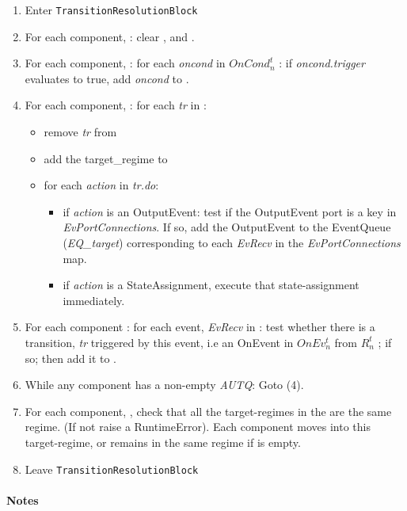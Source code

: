 \documentclass{article}
\begin{document}
\begin{enumerate}
\item Enter {\tt TransitionResolutionBlock}
\item For each component, \CN: clear \RCLn, \AUTQn and \EQn.
\item For each component, \CN: for each \textsl{oncond} in $OnCond^{t}_{n}$ : if
\textsl{oncond.trigger} evaluates to true, add \textsl{oncond} to \AUTQn.
\item For each component, \CN:  for each \textsl{tr} in \AUTQn :
\begin{itemize}
\item
remove \textsl{tr} from \AUTQn
\item add the target\_regime to \RCLn
\item for each
\textsl{action} in \textsl{tr.do}:
\begin{itemize}
\item if \textsl{action} is an OutputEvent: test
if the OutputEvent port is a key in \textsl{EvPortConnections}. If so, add the
    OutputEvent to the EventQueue (\textsl{EQ\_{target}}) corresponding to each
    \textsl{EvRecv} in the \textsl{EvPortConnections} map.

\item  if \textsl{action}  is a StateAssignment, execute that state-assignment
immediately.
\end{itemize}
\end{itemize}

\item For each component \CN: for each event, \textsl{EvRecv} in \EQn: test
whether there is a transition, \textsl{tr} triggered by this event, i.e an
OnEvent in $OnEv^t_n$ from $R^t_n$ ; if so; then add it to \AUTQn.

\item While any component has a non-empty \textsl{AUTQ}: Goto (4).

\item For each component, \CN, check that all the target-regimes in the \RCLn
are the same regime. (If not raise a RuntimeError). Each component moves into
this target-regime, or remains in the same regime if \RCLn is empty.

\item Leave {\tt TransitionResolutionBlock}

\end{enumerate}

\paragraph{Notes}
\end{document}
